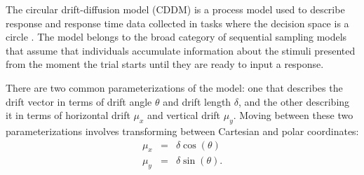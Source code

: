 \documentclass[9pt,twocolumn,twoside]{cidlab-draft}\templatetype{cidlab-invited}
\def\driftangle{\theta}
\def\driftlength{\delta}
\def\mux{\mu_x}
\def\muy{\mu_y}
\begin{document}
The circular drift-diffusion model (CDDM) is a process model used to describe response and response time data collected in tasks where the decision space is a circle \cite{smith2016diffusion}.  The model belongs to the broad category of sequential sampling models that assume that individuals accumulate information about the stimuli presented from the moment the trial starts until they are ready to input a response. 

There are two common parameterizations of the model: one that describes the drift vector in terms of drift angle $\driftangle$ and drift length $\driftlength$, and the other describing it in terms of horizontal drift $\mux$ and vertical drift $\muy$. Moving between these two parameterizations involves transforming between Cartesian and polar coordinates:
\begin{eqnarray*}
\mux &=& \driftlength \cos\left(\driftangle\right)\\
\muy &=& \driftlength \sin\left(\driftangle\right).
\end{eqnarray*}
\end{document}
